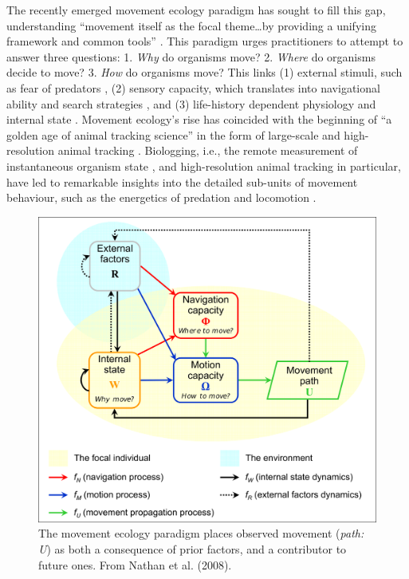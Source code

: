 The recently emerged movement ecology paradigm \citep[MEP;][see Fig. 1]{nathan2008a} has sought to fill this gap, understanding ``movement itself as the focal theme\ldots{}by providing a unifying framework and common tools'' \citep{nathan2008}.
This paradigm urges practitioners to attempt to answer three questions: 1. \emph{Why} do organisms move? 2. \emph{Where} do organisms decide to move? 3. \emph{How} do organisms move?
This links (1) external stimuli, such as fear of predators \citep{laundre2001}, (2) sensory capacity, which translates into navigational ability and search strategies \citep[e.g.][]{bartumeus2008}, and (3) life-history dependent physiology and internal state \citep[eg.][]{fryxell2008}.
Movement ecology's rise has coincided with the beginning of ``a golden age of animal tracking science'' in the form of large-scale and high-resolution animal tracking \citep{hussey2015, kays2015}.
Biologging, i.e., the remote measurement of instantaneous organism state \citep{cooke2004}, and high-resolution animal tracking in particular, have led to remarkable insights into the detailed sub-units of movement behaviour, such as the energetics of predation and locomotion \citep[see e.g.][]{williams2004, scantlebury2014}.

\begin{figure}
    \includegraphics[width=0.7\linewidth]{fig02_nathan_etal_2008.png}
    \caption{The movement ecology paradigm places observed movement (\emph{path: U}) as both a consequence of prior factors, and a contributor to future ones. From Nathan et al. (2008).}
    \label{fig:fig02nathanetal2008}
\end{figure}

